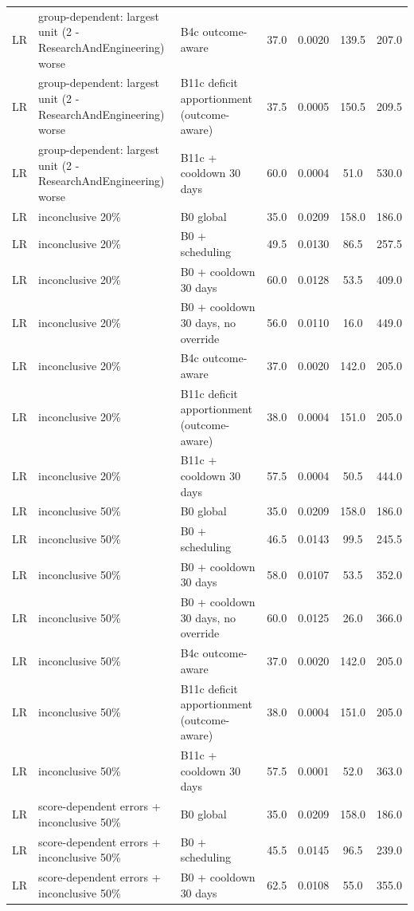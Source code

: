 \documentclass[10pt,onecolumn,letterpaper]{article}
\begin{document}
\begin{longtable}{lp{5.2cm}p{4.4cm}cccc}
LR & group-dependent: largest unit (2 - ResearchAndEngineering) worse & B4c outcome-aware & 37.0 & 0.0020 & 139.5 & 207.0 \\
LR & group-dependent: largest unit (2 - ResearchAndEngineering) worse & B11c deficit apportionment (outcome-aware) & 37.5 & 0.0005 & 150.5 & 209.5 \\
LR & group-dependent: largest unit (2 - ResearchAndEngineering) worse & B11c + cooldown 30 days & 60.0 & 0.0004 & 51.0 & 530.0 \\
LR & inconclusive 20\% & B0 global & 35.0 & 0.0209 & 158.0 & 186.0 \\
LR & inconclusive 20\% & B0 + scheduling & 49.5 & 0.0130 & 86.5 & 257.5 \\
LR & inconclusive 20\% & B0 + cooldown 30 days & 60.0 & 0.0128 & 53.5 & 409.0 \\
LR & inconclusive 20\% & B0 + cooldown 30 days, no override & 56.0 & 0.0110 & 16.0 & 449.0 \\
LR & inconclusive 20\% & B4c outcome-aware & 37.0 & 0.0020 & 142.0 & 205.0 \\
LR & inconclusive 20\% & B11c deficit apportionment (outcome-aware) & 38.0 & 0.0004 & 151.0 & 205.0 \\
LR & inconclusive 20\% & B11c + cooldown 30 days & 57.5 & 0.0004 & 50.5 & 444.0 \\
LR & inconclusive 50\% & B0 global & 35.0 & 0.0209 & 158.0 & 186.0 \\
LR & inconclusive 50\% & B0 + scheduling & 46.5 & 0.0143 & 99.5 & 245.5 \\
LR & inconclusive 50\% & B0 + cooldown 30 days & 58.0 & 0.0107 & 53.5 & 352.0 \\
LR & inconclusive 50\% & B0 + cooldown 30 days, no override & 60.0 & 0.0125 & 26.0 & 366.0 \\
LR & inconclusive 50\% & B4c outcome-aware & 37.0 & 0.0020 & 142.0 & 205.0 \\
LR & inconclusive 50\% & B11c deficit apportionment (outcome-aware) & 38.0 & 0.0004 & 151.0 & 205.0 \\
LR & inconclusive 50\% & B11c + cooldown 30 days & 57.5 & 0.0001 & 52.0 & 363.0 \\
LR & score-dependent errors + inconclusive 50\% & B0 global & 35.0 & 0.0209 & 158.0 & 186.0 \\
LR & score-dependent errors + inconclusive 50\% & B0 + scheduling & 45.5 & 0.0145 & 96.5 & 239.0 \\
LR & score-dependent errors + inconclusive 50\% & B0 + cooldown 30 days & 62.5 & 0.0108 & 55.0 & 355.0 \\

\end{longtable}
\end{document}
